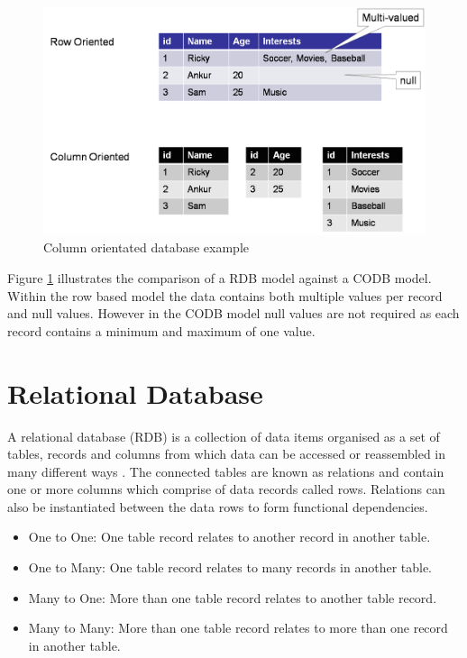 \begin{figure}[h]\begin{center}\includegraphics[width=1\linewidth]{images/codb}\caption{Column orientated database example}\label{fig:cod}\end{center}\end{figure}

Figure \ref{fig:cod} illustrates the comparison of a RDB model against a CODB model. Within the row based model the data contains both multiple values per record and null values. However in the CODB model null values are not required as each record contains a minimum and maximum of one value.

\section{Relational Database}
A relational database (RDB) is a collection of data items organised as a set of tables, records and columns from which data can be accessed or reassembled in many different ways \cite{rdb}. The connected tables are known as relations and contain one or more columns which comprise of data records called rows. Relations can also be instantiated between the data rows to form functional dependencies.

\begin{itemize}
\item One to One: One table record relates to another record in another table.
\item One to Many: One table record relates to many records in another table.
\item Many to One: More than one table record relates to another table record.
\item Many to Many: More than one table record relates to more than one record in another table.
\end{itemize}


